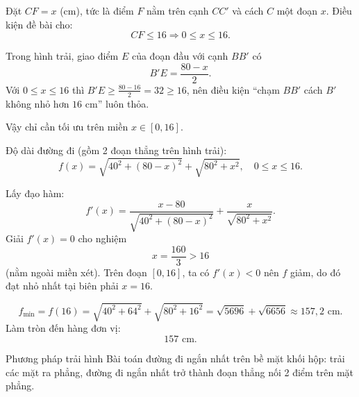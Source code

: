 \begin{loigiai}
{\par}

Đặt $CF=x$ (cm), tức là điểm $F$ nằm trên cạnh $CC'$ và cách $C$ một đoạn $x$.  
Điều kiện đề bài cho:
\[
CF\le 16 \Rightarrow 0\le x\le 16.
\]

Trong hình trải, giao điểm $E$ của đoạn đầu với cạnh $BB'$ có
\[
B'E=\frac{80-x}{2}.
\]
Với $0\le x\le 16$ thì $B'E\ge \frac{80-16}{2}=32\ge 16$, nên điều kiện ``chạm $BB'$ cách $B'$ không nhỏ hơn $16$ cm'' luôn thỏa.

Vậy chỉ cần tối ưu trên miền $x\in[0,16]$.

Độ dài đường đi (gồm 2 đoạn thẳng trên hình trải):
\[
f(x)=\sqrt{40^2+(80-x)^2}+\sqrt{80^2+x^2},\quad 0\le x\le16.
\]

Lấy đạo hàm:
\[
f'(x)=\frac{x-80}{\sqrt{40^2+(80-x)^2}}+\frac{x}{\sqrt{80^2+x^2}}.
\]
Giải $f'(x)=0$ cho nghiệm
\[
x=\frac{160}{3}>16
\]
(nằm ngoài miền xét). Trên đoạn $[0,16]$, ta có $f'(x)<0$ nên $f$ giảm, do đó đạt nhỏ nhất tại biên phải $x=16$.

{\centering
{}\par}

\[
f_{\min}=f(16)
=\sqrt{40^2+64^2}+\sqrt{80^2+16^2}
=\sqrt{5696}+\sqrt{6656}
\approx 157{,}2\text{ cm}.
\]
Làm tròn đến hàng đơn vị:
\[
\boxed{157\text{ cm}}.
\]
\end{loigiai}

\begin{meobotui}{Phương pháp trải hình}
Bài toán đường đi ngắn nhất trên bề mặt khối hộp: trải các mặt ra phẳng, đường đi ngắn nhất trở thành đoạn thẳng nối 2 điểm trên mặt phẳng.
\end{meobotui}

